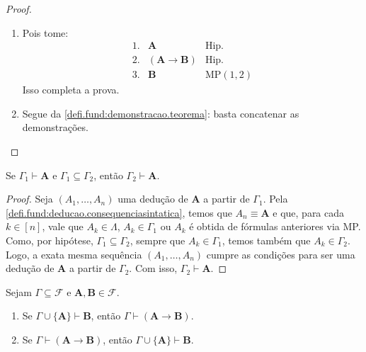 \begin{proof}
    \leavevmode
        \begin{enumerate}[leftmargin=*, align=left, label=\textbf{(\alph*)}]
            \item Pois tome:
                \[
                    \begin{array}{rll}
                        1. & \mathbf{A} & \text{Hip.} \\
                        2. & (\mathbf{A} \rightarrow \mathbf{B}) & \text{Hip.} \\
                        3. & \mathbf{B} & \text{MP}(1,2)
                    \end{array}
                \]
            Isso completa a prova. \blackproof
            \item Segue da \cref{defi.fund:demonstracao.teorema}: basta concatenar as demonstrações. \blackproof
        \end{enumerate}
\end{proof}

\begin{lemma}
    Se $\Gamma_1 \vdash \mathbf{A}$ e $\Gamma_1 \subseteq \Gamma_2$, então $\Gamma_2 \vdash \mathbf{A}$.
\end{lemma}

\begin{proof}
    Seja $(A_1, \ldots, A_n)$ uma dedução de $\mathbf{A}$ a partir de $\Gamma_1$.
    Pela \cref{defi.fund:deducao.consequenciasintatica}, temos que $A_n \equiv \mathbf{A}$ e que, para cada $k \in [n]$, vale que $A_k \in \Lambda$, $A_k \in \Gamma_1$ ou $A_k$ é obtida de fórmulas anteriores via MP.
    Como, por hipótese, $\Gamma_1 \subseteq \Gamma_2$, sempre que $A_k \in \Gamma_1$, temos também que $A_k \in \Gamma_2$.
    Logo, a exata mesma sequência $(A_1, \ldots, A_n)$ cumpre as condições para ser uma dedução de $\mathbf{A}$ a partir de $\Gamma_2$.
    Com isso, $\Gamma_2 \vdash \mathbf{A}$. \blackproof
\end{proof}

\begin{theorem}[da Dedução] \label{teo.fund:deduçãoproposicional}
    Sejam $\Gamma \subseteq \mathcal{F}$ e $\mathbf{A}, \mathbf{B} \in \mathcal{F}$.
        \begin{enumerate}[leftmargin=*, align=left, label=\textbf{(\alph*)}]
            \item Se $\Gamma \cup \{\mathbf{A}\} \vdash \mathbf{B}$, então $\Gamma \vdash (\mathbf{A} \rightarrow \mathbf{B})$.
            \item Se $\Gamma \vdash (\mathbf{A} \rightarrow \mathbf{B})$, então $\Gamma \cup \{\mathbf{A}\} \vdash \mathbf{B}$.
        \end{enumerate}
\end{theorem}

